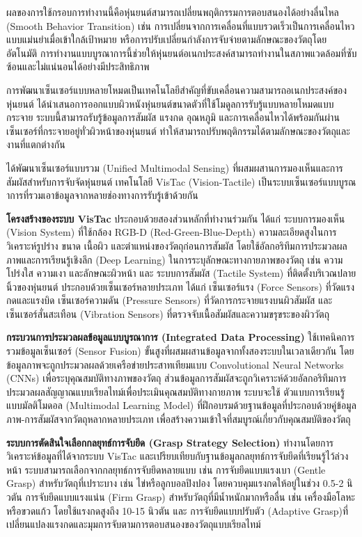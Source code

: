 \documentclass[a4paper]{article}
\begin{document}
ผลของการใช้กรอบการทำงานนี้คือหุ่นยนต์สามารถเปลี่ยนพฤติกรรมการตอบสนองได้อย่างลื่นไหล (Smooth Behavior Transition) เช่น การเปลี่ยนจากการเคลื่อนที่แบบรวดเร็วเป็นการเคลื่อนไหวแบบแม่นยำเมื่อเข้าใกล้เป้าหมาย หรือการปรับเปลี่ยนกำลังการจับจ่ายตามลักษณะของวัตถุโดยอัตโนมัติ \parencite{athar2023vistac} การทำงานแบบบูรณาการนี้ช่วยให้หุ่นยนต์อเนกประสงค์สามารถทำงานในสภาพแวดล้อมที่ซับซ้อนและไม่แน่นอนได้อย่างมีประสิทธิภาพ

การพัฒนาเซ็นเซอร์แบบหลายโหมดเป็นเทคโนโลยีสำคัญที่ขับเคลื่อนความสามารถอเนกประสงค์ของหุ่นยนต์ \textcite{yang2024body} ได้นำเสนอการออกแบบผิวหนังหุ่นยนต์ขนาดตัวที่ใช้โมดูลการรับรู้แบบหลายโหมดแบบกระจาย ระบบนี้สามารถรับรู้ข้อมูลการสัมผัส แรงกด อุณหภูมิ และการเคลื่อนไหวได้พร้อมกันผ่านเซ็นเซอร์ที่กระจายอยู่ทั่วผิวหน้าของหุ่นยนต์ ทำให้สามารถปรับพฤติกรรมได้ตามลักษณะของวัตถุและงานที่แตกต่างกัน

\textcite{athar2023vistac} ได้พัฒนาเซ็นเซอร์แบบรวม (Unified Multimodal Sensing) ที่ผสมผสานการมองเห็นและการสัมผัสสำหรับการจับจัดหุ่นยนต์ เทคโนโลยี VisTac (Vision-Tactile) เป็นระบบเซ็นเซอร์แบบบูรณาการที่รวมเอาข้อมูลจากหลายช่องทางการรับรู้เข้าด้วยกัน

\textbf{โครงสร้างของระบบ VisTac} ประกอบด้วยสองส่วนหลักที่ทำงานร่วมกัน ได้แก่ ระบบการมองเห็น (Vision System) ที่ใช้กล้อง RGB-D (Red-Green-Blue-Depth) ความละเอียดสูงในการวิเคราะห์รูปร่าง ขนาด เนื้อผิว และตำแหน่งของวัตถุก่อนการสัมผัส โดยใช้อัลกอริทึมการประมวลผลภาพและการเรียนรู้เชิงลึก (Deep Learning) ในการระบุลักษณะทางกายภาพของวัตถุ เช่น ความโปร่งใส ความเงา และลักษณะผิวหน้า และ ระบบการสัมผัส (Tactile System) ที่ติดตั้งบริเวณปลายนิ้วของหุ่นยนต์ ประกอบด้วยเซ็นเซอร์หลายประเภท ได้แก่ เซ็นเซอร์แรง (Force Sensors) ที่วัดแรงกดและแรงบิด เซ็นเซอร์ความดัน (Pressure Sensors) ที่วัดการกระจายแรงบนผิวสัมผัส และเซ็นเซอร์สั่นสะเทือน (Vibration Sensors) ที่ตรวจจับเนื้อสัมผัสและความขรุขระของผิววัตถุ

\textbf{กระบวนการประมวลผลข้อมูลแบบบูรณาการ (Integrated Data Processing)} ใช้เทคนิคการรวมข้อมูลเซ็นเซอร์ (Sensor Fusion) ขั้นสูงที่ผสมผสานข้อมูลจากทั้งสองระบบในเวลาเดียวกัน โดยข้อมูลภาพจะถูกประมวลผลด้วยเครือข่ายประสาทเทียมแบบ Convolutional Neural Networks (CNNs) เพื่อระบุคุณสมบัติทางภาพของวัตถุ ส่วนข้อมูลการสัมผัสจะถูกวิเคราะห์ด้วยอัลกอริทึมการประมวลผลสัญญาณแบบเรียลไทม์เพื่อประเมินคุณสมบัติทางกายภาพ ระบบจะใช้ ตัวแบบการเรียนรู้แบบมัลติโมดอล (Multimodal Learning Model) ที่ฝึกอบรมด้วยฐานข้อมูลที่ประกอบด้วยคู่ข้อมูลภาพ-การสัมผัสจากวัตถุหลากหลายประเภท เพื่อสร้างความเข้าใจที่สมบูรณ์เกี่ยวกับคุณสมบัติของวัตถุ

\textbf{ระบบการตัดสินใจเลือกกลยุทธ์การจับยึด (Grasp Strategy Selection)} ทำงานโดยการวิเคราะห์ข้อมูลที่ได้จากระบบ VisTac และเปรียบเทียบกับฐานข้อมูลกลยุทธ์การจับยึดที่เรียนรู้ไว้ล่วงหน้า \parencite{yang2024body} ระบบสามารถเลือกจากกลยุทธ์การจับยึดหลายแบบ เช่น การจับยึดแบบแรงเบา (Gentle Grasp) สำหรับวัตถุที่เปราะบาง เช่น ไข่หรือลูกบอลปิงปอง โดยควบคุมแรงกดให้อยู่ในช่วง 0.5-2 นิวตัน การจับยึดแบบแรงแน่น (Firm Grasp) สำหรับวัตถุที่มีน้ำหนักมากหรือลื่น เช่น เครื่องมือโลหะหรือขวดแก้ว โดยใช้แรงกดสูงถึง 10-15 นิวตัน และ การจับยึดแบบปรับตัว (Adaptive Grasp)ที่เปลี่ยนแปลงแรงกดและมุมการจับตามการตอบสนองของวัตถุแบบเรียลไทม์
\end{document}

